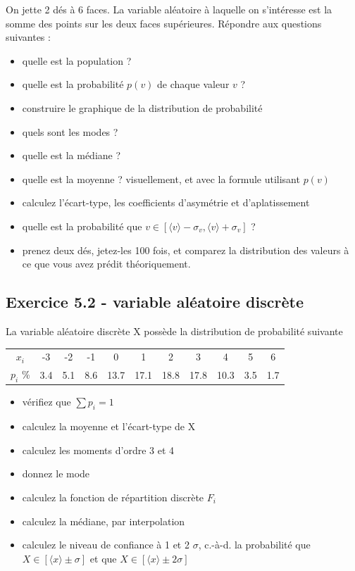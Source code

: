 \documentclass[main.tex]{subfiles}
\begin{document}
On jette 2 dés à 6 faces. La variable aléatoire à laquelle on s'intéresse est la somme des points sur les deux faces supérieures. Répondre aux questions suivantes :
\begin{itemize}
    \item quelle est la population ?
    \item quelle est la probabilité $p(v)$ de chaque valeur $v$ ?
    \item construire le graphique de la distribution de probabilité
    \item quels sont les modes ?
    \item quelle est la médiane ?
    \item quelle est la moyenne ? visuellement, et avec la formule utilisant $p(v)$
    \item calculez l'écart-type, les coefficients d'asymétrie et d'aplatissement
    \item quelle est la probabilité que $v\in[\langle v \rangle-\sigma_v,\langle v \rangle+\sigma_v]$ ?
    \item prenez deux dés, jetez-les 100 fois, et comparez la distribution des valeurs à ce que vous avez prédit théoriquement.
\end{itemize}

\subsection*{Exercice 5.2 - variable aléatoire discrète}

La variable aléatoire discrète X possède la distribution de probabilité suivante
\begin{center}
    \begin{tabular}{c|cccccccccc}
        $x_i$    & -3  & -2  & -1  & 0    & 1    & 2    & 3    & 4    & 5   & 6   \\
        $p_i$ \% & 3.4 & 5.1 & 8.6 & 13.7 & 17.1 & 18.8 & 17.8 & 10.3 & 3.5 & 1.7
    \end{tabular}
\end{center}
\begin{itemize}
    \item vérifiez que $\sum p_i=1$
    \item calculez la moyenne et l'écart-type de X
    \item calculez les moments d'ordre 3 et 4
    \item donnez le mode
    \item calculez la fonction de répartition discrète $F_i$
    \item calculez la médiane, par interpolation
    \item calculez le niveau de confiance à 1 et 2 $\sigma$, c.-à-d. la probabilité que $X\in[\langle x\rangle\pm\sigma]$ et que $X\in[\langle x\rangle\pm2\sigma]$
\end{itemize}
\end{document}
